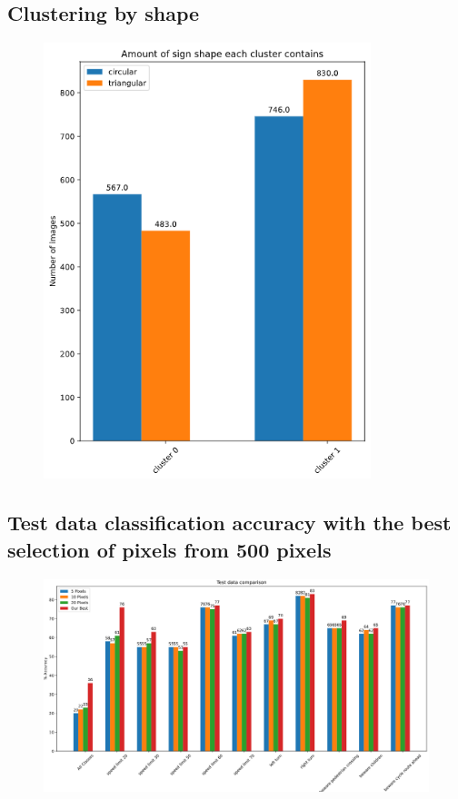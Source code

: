 \documentclass[11pt]{article}
\begin{document}
\begin{appendices}
\subsection{Clustering by shape}\label{ClusteringByShape} 
\begin{figure}[h!]
  \includegraphics[width=0.85\textwidth]{images/_clustering_by_shape_allPixels.png}
\end{figure}

\newpage
\subsection{Test data classification accuracy with the best selection of pixels from 500 pixels}\label{500pixelsTestdata}
\begin{figure}[h!]
  \centering
  \includegraphics[scale=0.4]{images/test_data_comparison_pixels.PNG}
\end{figure}



\end{appendices}
\end{document}
